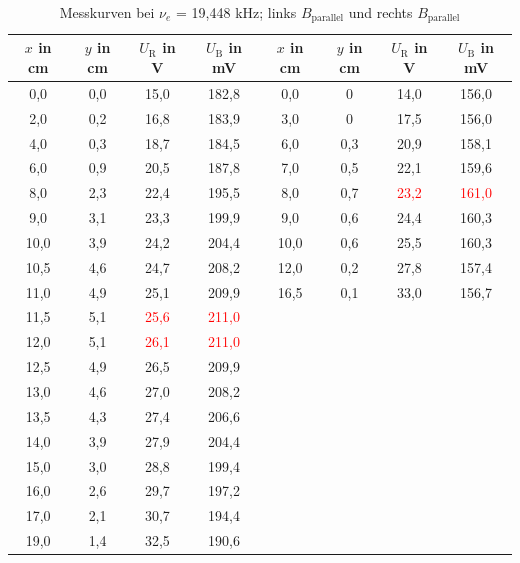 \begin{table}[H]
 \begin{tabular}{c|c|c|c||c|c|c|c}
  $x$ in cm & $y$ in cm & $U_\text{R}$ in V & $U_\text{B} $ in mV & $x$ in cm & $y$ in cm & $U_\text{R}$ in V & $U_\text{B}$ in mV \\
 \hline
0,0	&0,0&	15,0&	182,8	&0,0&	0&	14,0&	156,0\\
2,0&	0,2&	16,8&	183,9&	3,0&	0&	17,5&	156,0\\
4,0&	0,3&	18,7&	184,5&	6,0&	0,3&	20,9&	158,1\\
6,0&	0,9&	20,5&	187,8&	7,0&	0,5&	22,1&	159,6\\
8,0&	2,3&	22,4&	195,5&	8,0&	0,7&	\textcolor{red}{23,2}&	\textcolor{red}{161,0}\\
9,0&	3,1&	23,3&	199,9&	9,0&	0,6&	24,4&	160,3\\
10,0&	3,9&	24,2&	204,4&	10,0&	0,6&	25,5&	160,3\\
10,5&	4,6&	24,7&	208,2&	12,0&	0,2&	27,8&	157,4\\
11,0&	4,9&	25,1&	209,9&	16,5&	0,1&	33,0&	156,7\\
11,5&	5,1&	\textcolor{red}{25,6}&	\textcolor{red}{211,0}&		&&		&\\
12,0&	5,1&	\textcolor{red}{26,1}&	\textcolor{red}{211,0}&		&&		&\\
12,5&	4,9&	26,5&	209,9&		&&		&\\
13,0&	4,6&	27,0&	208,2&		&&		&\\
13,5&	4,3&	27,4&	206,6&		&&		&\\
14,0&	3,9&	27,9&	204,4&		&&		&\\
15,0&	3,0&	28,8&	199,4&		&&		&\\
16,0&	2,6&	29,7&	197,2&		&&		&\\
17,0&	2,1&	30,7&	194,4&		&&		&\\
19,0&	1,4&	32,5&	190,6&		&&		& \\

 \end{tabular}
 \caption{Messkurven bei $\nu_e$ = 19,448 kHz; links $B_\text{parallel}$ und rechts $B_\text{parallel}$}
 \label{tab_xAxisKalib20MHz}
\end{table}
